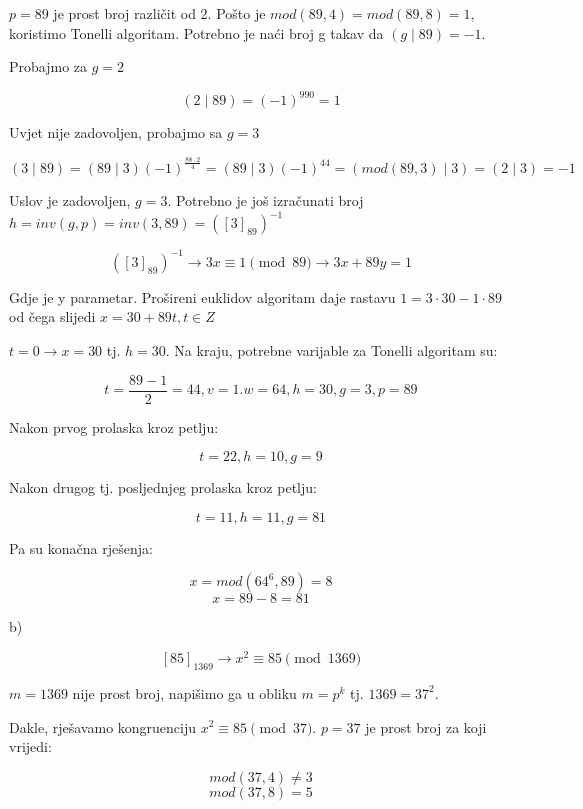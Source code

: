 \documentclass[12pt]{article}
\begin{document}
$p = 89$ je prost broj različit od 2. Pošto je $mod(89, 4) = mod(89, 8) = 1$, koristimo Tonelli algoritam. Potrebno je naći broj g takav da $(g\mid89) = -1$.

Probajmo za \underline{$g = 2$}

$$(2\mid89) = (-1)^{990} = 1$$\vspace{1mm}

Uvjet nije zadovoljen, probajmo sa \underline{$g = 3$}

$$(3\mid89) = (89\mid3)(-1)^{\frac{88 \cdot 2}{4}} = (89 \mid 3)(-1)^{44} = (mod(89, 3) \mid 3) = (2 \mid 3) = -1$$\vspace{1mm}

Uslov je zadovoljen, $g = 3$. Potrebno je još izračunati broj $h = inv(g, p) = inv(3, 89) = ([3]_{89})^{-1}$

$$([3]_{89})^{-1} \to 3x \equiv 1 \pmod{89} \to 3x + 89y = 1$$\vspace{1mm}

Gdje je y parametar. Prošireni euklidov algoritam daje rastavu $1 = 3 \cdot 30 - 1 \cdot 89$ od čega slijedi $x = 30 + 89t, t \in Z$

$t = 0 \to x = 30$ tj.  $h = 30$. Na kraju, potrebne varijable za Tonelli algoritam su:

$$t = \frac{89-1}{2} = 44, v = 1. w = 64, h = 30, g = 3, p = 89$$\vspace{1mm}

Nakon prvog prolaska kroz petlju:

$$t = 22, h = 10, g = 9$$\vspace{1mm}

Nakon drugog tj. posljednjeg prolaska kroz petlju:

$$t = 11, h = 11, g = 81$$\vspace{1mm}

Pa su konačna rješenja:

$$x = mod(64^6, 89) = 8$$
$$x = 89 - 8 = 81$$\vspace{1mm}

b)

$$[85]_{1369} \to x^{2} \equiv 85 \pmod{1369}$$\vspace{1mm}

$m = 1369$ nije prost broj, napišimo ga u obliku $m = p^k$ tj. $1369 = 37^2$. 

Dakle, rješavamo kongruenciju $x^2 \equiv 85 \pmod{37}$. $p = 37$ je prost broj za koji vrijedi:

$$mod(37, 4) \neq 3$$
$$mod(37, 8) = 5$$\vspace{1mm}
\end{document}
